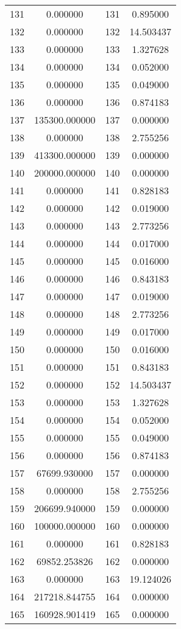 \documentclass[12pt]{article}
\begin{document}
\begin{longtable}{@{}cccc@{}}
131 & 0.000000 & 131 & 0.895000 \\
132 & 0.000000 & 132 & 14.503437 \\
133 & 0.000000 & 133 & 1.327628 \\
134 & 0.000000 & 134 & 0.052000 \\
135 & 0.000000 & 135 & 0.049000 \\
136 & 0.000000 & 136 & 0.874183 \\
137 & 135300.000000 & 137 & 0.000000 \\
138 & 0.000000 & 138 & 2.755256 \\
139 & 413300.000000 & 139 & 0.000000 \\
140 & 200000.000000 & 140 & 0.000000 \\
141 & 0.000000 & 141 & 0.828183 \\
142 & 0.000000 & 142 & 0.019000 \\
143 & 0.000000 & 143 & 2.773256 \\
144 & 0.000000 & 144 & 0.017000 \\
145 & 0.000000 & 145 & 0.016000 \\
146 & 0.000000 & 146 & 0.843183 \\
147 & 0.000000 & 147 & 0.019000 \\
148 & 0.000000 & 148 & 2.773256 \\
149 & 0.000000 & 149 & 0.017000 \\
150 & 0.000000 & 150 & 0.016000 \\
151 & 0.000000 & 151 & 0.843183 \\
152 & 0.000000 & 152 & 14.503437 \\
153 & 0.000000 & 153 & 1.327628 \\
154 & 0.000000 & 154 & 0.052000 \\
155 & 0.000000 & 155 & 0.049000 \\
156 & 0.000000 & 156 & 0.874183 \\
157 & 67699.930000 & 157 & 0.000000 \\
158 & 0.000000 & 158 & 2.755256 \\
159 & 206699.940000 & 159 & 0.000000 \\
160 & 100000.000000 & 160 & 0.000000 \\
161 & 0.000000 & 161 & 0.828183 \\
162 & 69852.253826 & 162 & 0.000000 \\
163 & 0.000000 & 163 & 19.124026 \\
164 & 217218.844755 & 164 & 0.000000 \\
165 & 160928.901419 & 165 & 0.000000 \\

\end{longtable}
\end{document}
